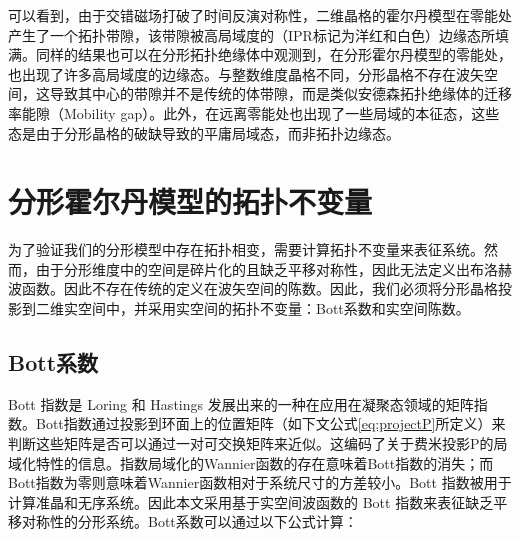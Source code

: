 可以看到，由于交错磁场打破了时间反演对称性，二维晶格的霍尔丹模型在零能处产生了一个拓扑带隙，该带隙被高局域度的（IPR标记为洋红和白色）边缘态所填满。同样的结果也可以在分形拓扑绝缘体中观测到，在分形霍尔丹模型的零能处，也出现了许多高局域度的边缘态。与整数维度晶格不同，分形晶格不存在波矢空间，这导致其中心的带隙并不是传统的体带隙，而是类似安德森拓扑绝缘体的迁移率能隙（Mobility gap）。此外，在远离零能处也出现了一些局域的本征态，这些态是由于分形晶格的破缺导致的平庸局域态，而非拓扑边缘态。
\section{分形霍尔丹模型的拓扑不变量}
为了验证我们的分形模型中存在拓扑相变，需要计算拓扑不变量来表征系统。然而，由于分形维度中的空间是碎片化的且缺乏平移对称性，因此无法定义出布洛赫波函数。因此不存在传统的定义在波矢空间的陈数。因此，我们必须将分形晶格投影到二维实空间中，并采用实空间的拓扑不变量：Bott系数\cite{titum2015disorder,wang2020bosonic}和实空间陈数\cite{mitchell2018amorphous}。
\subsection{Bott系数}
Bott 指数是 Loring 和 Hastings 发展出来的一种在应用在凝聚态领域的矩阵指数\cite{hastings2010almost,hastings2011topological}。Bott指数通过投影到环面上的位置矩阵（如下文公式\ref{eq:projectP}所定义）来判断这些矩阵是否可以通过一对可交换矩阵来近似。这编码了关于费米投影P的局域化特性的信息。指数局域化的Wannier函数的存在意味着Bott指数的消失；而Bott指数为零则意味着Wannier函数相对于系统尺寸的方差较小\cite{hastings2011topological}。Bott 指数被用于计算准晶\cite{huang2018quantum}和无序系统\cite{wang2020bosonic}。因此本文采用基于实空间波函数的 Bott 指数来表征缺乏平移对称性的分形系统。Bott系数可以通过以下公式计算\cite{titum2015disorder,wang2020bosonic}：

